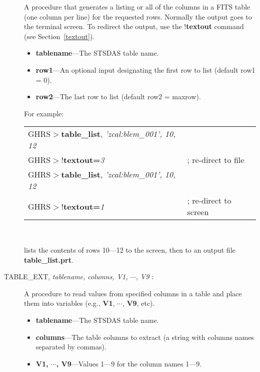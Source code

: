 \begin{description}
A procedure that generates a listing or all of the columns in a FITS
table (one column per line) for the requested rows. Normally the
output goes to the terminal screen.  To redirect the output, use the
{\bf $!$textout} command (see Section~\ref{textout}). 

\begin{itemize}

\item {\bf tablename}---The STSDAS table name.

\item {\bf row1}---An optional input designating the first row to list 
(default row1 = 0).

\item {\bf row2}---The last row to list (default row2 = maxrow).

\end{itemize}

\noindent
For example:\\

\begin{tabular}{ll}
GHRS$>${\bf table\_list}, {\it 'zcal:blem\_001', 10, 12} & \\
GHRS$>${\bf $!$textout=}{\it 3} & ; re-direct to file\\
GHRS$>${\bf table\_list}, {\it 'zcal:blem\_001', 10, 12} & \\
GHRS$>${\bf $!$textout=}{\it 1} & ; re-direct to screen\\
\end{tabular}\\
\newpage

\noindent
lists 
the contents of rows 10---12 to the screen, then to an output file 
{\bf table\_list.prt}.

\item [TABLE\_EXT, {\it tablename, columns, V1, $\cdots$, V9} : ] 

A procedure to read values from specified columns in a table and
place them into variables (e.g., {\bf V1}, $\cdots$, {\bf V9}, etc).

\begin{itemize}

\item {\bf tablename}---The STSDAS table name.

\item {\bf columns}---The table columns to extract (a string with columns 
names separated by commas).

\item {\bf V1, $\cdots$, V9}---Values 1---9 for the column names 1---9.
\end{itemize}


\end{description}
